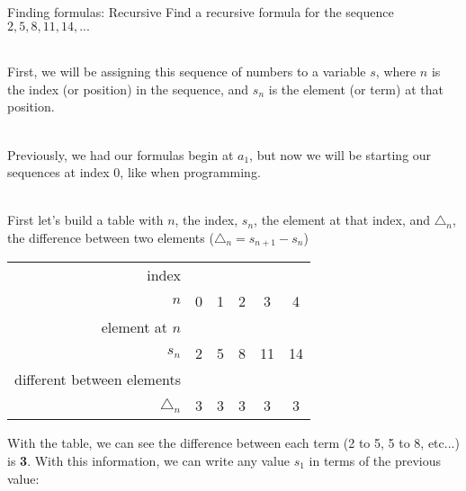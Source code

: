{    \begin{intro}{Finding formulas: Recursive}
        Find a recursive formula for the sequence $2, 5, 8, 11, 14, ...$

        ~\\     First, we will be assigning this sequence of numbers to a variable $s$,
                where $n$ is the index (or position) in the sequence, and $s_{n}$ is
                the element (or term) at that position.

        ~\\     Previously, we had our formulas begin at $a_{1}$, but now we will
                be starting our sequences at index $0$, like when programming.

        ~\\     First let's build a table with $n$, the index, $s_{n}$, the element
                at that index, and $\triangle_{n}$, the difference between two elements
                ($\triangle_{n} = s_{n+1} - s_{n}$)

        \begin{center}
            \begin{tabular}{| r | c | c | c | c | c | }
                \hline
                \footnotesize   index & & & & & \\ 
                $n$
                & 0 & 1 & 2 & 3 & 4
                \\ \hline
                
                \footnotesize element at $n$ & & & & & \\
                $s_{n}$
                & 2 & 5 & 8 & 11 & 14
                \\ \hline
                
                \footnotesize different between elements & & & & & \\
                $\triangle_{n}$
                & 3 & 3 & 3 & 3 & 3
                \\ \hline
            \end{tabular}
        \end{center}

        With the table, we can see the difference between each term (2 to 5, 5 to 8, etc...) is \textbf{3}.
        With this information, we can write any value $s_{1}$ in terms of the previous value:
    

\end{intro}}
